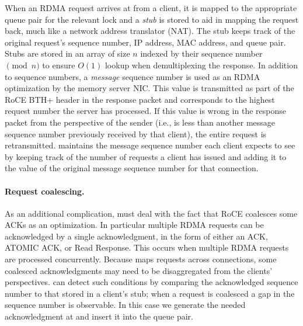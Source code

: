 When an RDMA request arrives at {\sword} from a client, it is
mapped to the appropriate queue pair for the relevant lock and a
\emph{stub} is stored to aid in mapping the request back, much like a
network address translator (NAT). The stub keeps track of the original
request's sequence number, IP address, MAC address, and queue
pair. Stubs are stored in an array of size $n$ indexed by their
sequence number $\pmod n$ to ensure $O(1)$ lookup when demultiplexing
the response.
In addition to sequence numbers, a \emph{message} sequence number
is used as an RDMA optimization by the memory server NIC. This value
is transmitted as part of the RoCE BTH+ header in the response packet
and corresponds to the highest request number the server has
processed. If this value is wrong in the response packet from the
perspective of the sender (i.e., is less than another message sequence
number previously received by that client), the entire request is
retransmitted.  {\sword} maintains the message sequence number each client
expects to see by keeping track of the number of requests a client has
issued and adding it to the value of the original message sequence
number for that connection.

\paragraph{Request coalescing.}

As an additional complication, {\sword} must deal with the fact
that RoCE coalesces some ACKs as an optimization.  In particular
multiple RDMA requests can be acknowledged by a single
acknowledgment, in the form of either an ACK, ATOMIC ACK, or Read
Response. This occurs when multiple RDMA requests are processed
concurrently.  Because {\sword} maps requests across connections, some
coalesced acknowledgments may need to be disaggregated from the
clients' perspectives.
%
{\sword} can detect such conditions by comparing the
acknowledged sequence number to that stored in a client's stub; when a
request is coalesced a gap in the sequence number is observable. In
this case we generate the needed acknowledgment at {\sword} and
insert it into the queue pair.



